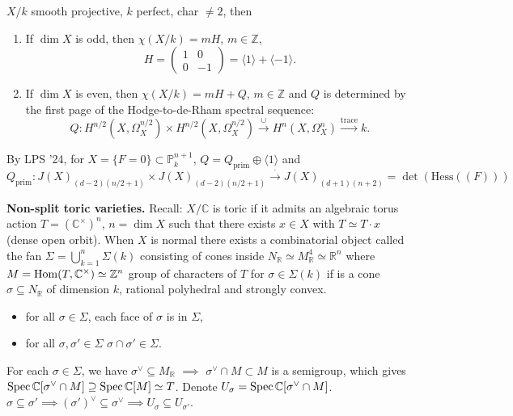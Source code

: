 \begin{theorem}[Levine '20]
\label{theorem-levine20}
$X/k$ smooth projective, $k$ perfect,
char $\neq 2$, then
\begin{enumerate}
\item If $\dim X$ is odd, then
$\chi(X/k) = mH$, $m \in \mathbb{Z}$,
$$
H=\begin{pmatrix}1&0\\ 0&-1\end{pmatrix}
=\langle 1\rangle+ \langle-1\rangle.
$$
\item If $\dim X$ is even, then
$\chi(X/k)=mH+Q$, $m \in \mathbb{Z}$
and $Q$ is determined by the first
page of the Hodge-to-de-Rham spectral
sequence:
$$
Q: H^{n/2}(X,\Omega^{n/2}_X)\times
H^{n/2}(X,\Omega_X^{n/2})
\xrightarrow{\cup }
H^n(X,\Omega_X^n)
\xrightarrow{\operatorname{trace}}k.
$$
\end{enumerate}
\end{theorem}

\noindent
By LPS '24, for $X = \{F=0\}
\subset \mathbb{P}^{n+1}_k$,
$Q = Q_{\operatorname{prim}} \oplus
\langle 1\rangle$ and
$$
Q_{\operatorname{prim}}:
J(X) _{(d-2)(n/2+1)}\times
J(X)_{(d-2)(n/2+1)}\xrightarrow{\cdot}
J(X)_{(d+1)(n+2)}
=\det (\text{Hess}((F)))
$$

\medskip\noindent
{\bf Non-split toric varieties.}
Recall: $X/\mathbb{C}$ is toric
if it admits an algebraic torus action
$T = (\mathbb{C}^\times)^n$, $n = \dim X$
such that there exists $x \in X$
with $T \simeq T\cdot x$ (dense open orbit).
When $X$ is normal there exists a
combinatorial object called the fan
$\Sigma = \bigcup_{k=1}^n \Sigma(k)$
consisting of cones inside $N_{\mathbb{R}}
\simeq M^4_{\mathbb{R}} \simeq \mathbb{R}^n$
where $M = \mathop{\mathrm{Hom}}\nolimits(T,\mathbb{C}^\times)
\simeq \mathbb{Z}^n$
group of characters of $T$
for $\sigma \in \Sigma(k)$
if is a cone $\sigma \subseteq N_{\mathbb{R}}$
of dimension $k$, rational polyhedral
and strongly convex.

\begin{itemize}
\item for all $\sigma \in \Sigma$,
each face of $\sigma$ is in $\Sigma$,
\item for all $\sigma,\sigma' \in \Sigma$
$\sigma \cap \sigma' \in \Sigma$.
\end{itemize}

\noindent
For each $\sigma \in \Sigma$, we have
$\sigma^\vee \subseteq M_{\mathbb{R}}$
$\implies $ $\sigma^\vee \cap M \subset M$
is a semigroup, which gives
$\mathop{\mathrm{Spec}} \mathbb{C}[\sigma^\vee\cap M]
\supseteq \mathop{\mathrm{Spec}} \mathbb{C}[M]
\simeq T$.
Denote $U_\sigma = \mathop{\mathrm{Spec}}
\mathbb{C}[\sigma^\vee \cap M]$.
$\sigma \subseteq \sigma' \implies
(\sigma')^\vee \subseteq \sigma^\vee \implies 
U_\sigma \subseteq U_{\sigma'}$.

